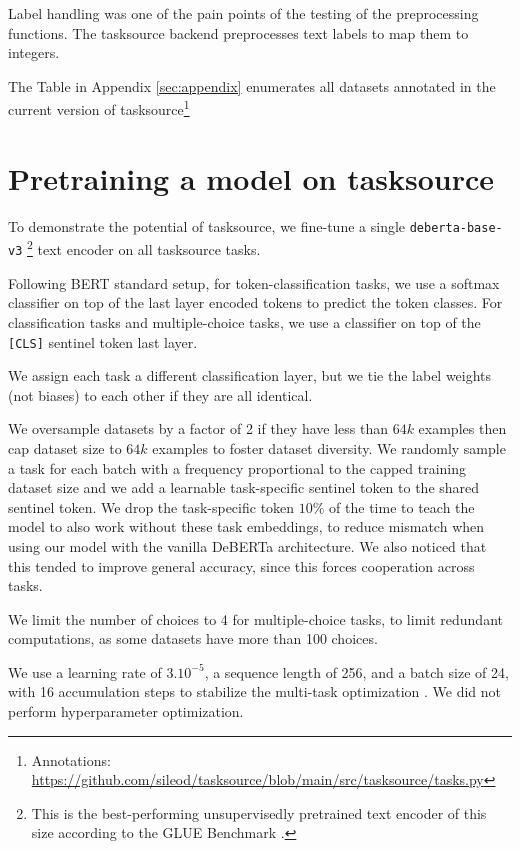 \documentclass[11pt]{article}
\begin{document}
Label handling was one of the pain points of the testing of the preprocessing functions. The tasksource backend preprocesses text labels to map them to integers. 

The Table in Appendix \ref{sec:appendix} enumerates all datasets annotated in the current version of tasksource\footnote{Annotations: \url{https://github.com/sileod/tasksource/blob/main/src/tasksource/tasks.py}}

\section{Pretraining a model on tasksource \label{sec:model}}
To demonstrate the potential of tasksource, we fine-tune a single \texttt{deberta-base-v3} \citep{he2021debertav3}\footnote{This is the best-performing unsupervisedly pretrained text encoder of this size according to the GLUE Benchmark \citep{wang2019glue}.} text encoder on all tasksource tasks.

Following BERT \citep{devlin-etal-2019-bert} standard setup, for token-classification tasks, we use a softmax classifier on top of the last layer encoded tokens to predict the token classes. For classification tasks and multiple-choice tasks, we use a classifier on top of the \texttt{[CLS]} sentinel token last layer.

We assign each task a different classification layer, but we tie the label weights (not biases) to each other if they are all identical. 

We oversample datasets by a factor of 2 if they have less than $64k$ examples then cap dataset size to $64k$ examples to foster dataset diversity. We randomly sample a task for each batch with a frequency proportional to the capped training dataset size and we add a learnable task-specific sentinel token to the shared sentinel token. We drop the task-specific token $10\%$ of the time to teach the model to also work without these task embeddings, to reduce mismatch when using our model with the vanilla DeBERTa architecture.  We also noticed that this tended to improve general accuracy, since this forces cooperation across tasks.

We limit the number of choices to 4 for multiple-choice tasks, to limit redundant computations, as some datasets have more than 100 choices.

We use a learning rate of $3.10^{-5}$, a sequence length of 256, and a batch size of 24, with 16 accumulation steps to stabilize the multi-task optimization \citep{yu2020gradient}. We did not perform hyperparameter optimization.
\end{document}
